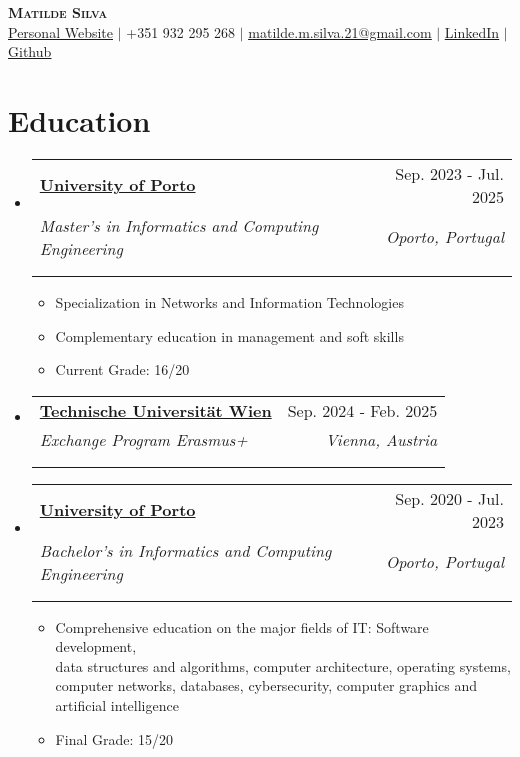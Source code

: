 \documentclass[a4paper,11pt]{article}
\makeatletter
\newcommand{\resumeItem}[1]{
  \item\small{
    {#1 \vspace{-2pt}}
  }
}
\newcommand{\resumeSubheading}[5]{
  \vspace{-2pt}\item
    \begin{tabular*}{0.97\textwidth}[t]{l@{\extracolsep{\fill}}r}
      \textbf{#1} & #2 \\
      \textit{\small#3} & \textit{\small #4} \\
      \if\relax\detokenize{#5}\relax
      \else
        \multicolumn{2}{@{}l}{\textit{\small#5}} \\
      \fi
    \end{tabular*}\vspace{-7pt}
}
\newcommand{\resumeSubHeadingListStart}{\begin{itemize}[leftmargin=0.15in, label={}]}
\newcommand{\resumeSubHeadingListEnd}{\end{itemize}}
\newcommand{\resumeItemListStart}{\begin{itemize}}
\newcommand{\resumeItemListEnd}{\end{itemize}\vspace{-5pt}}
\makeatother
\begin{document}
\begin{center}
    \textbf{\Huge \scshape Matilde Silva} \\ \vspace{10pt}
    \small \href{https://matilde-silva-21.github.io/}{\uline{Personal Website}} $|$
	+351 932 295 268 $|$
	\href{mailto:matilde.m.silva.21@gmail.com}{\uline{matilde.m.silva.21@gmail.com}} $|$
    \href{https://www.linkedin.com/in/matilde-m-silva/}{\uline{LinkedIn}} $|$
    \href{https://github.com/matilde-silva-21}{\uline{Github}}
\end{center}

\section{Education}
  \resumeSubHeadingListStart
      \resumeSubheading
      {\href{https://sigarra.up.pt/feup/en/WEB_PAGE.INICIAL}{University of Porto}}{Sep. 2023 - Jul. 2025}
      {Master's in Informatics and Computing Engineering}{Oporto, Portugal}
      {}
	  	\resumeItemListStart
            \resumeItem{Specialization in Networks and Information Technologies}
			\resumeItem{Complementary education in management and soft skills}
			\resumeItem{Current Grade: 16/20}
		\resumeItemListEnd
    \resumeSubheading
      {\href{https://informatics.tuwien.ac.at/}{Technische Universität Wien}}{Sep. 2024 - Feb. 2025}
      {Exchange Program Erasmus+}{Vienna, Austria}
      {}
    \resumeSubheading
      {\href{https://sigarra.up.pt/feup/en/WEB_PAGE.INICIAL}{University of Porto}}{Sep. 2020 - Jul. 2023}
      {Bachelor's in Informatics and Computing Engineering}{Oporto, Portugal}
      {}
	  	\resumeItemListStart
            \resumeItem{Comprehensive education on the major fields of IT: Software development,\\data structures and algorithms, computer architecture, operating systems,\\computer networks, databases, cybersecurity, computer graphics and artificial intelligence}
			\resumeItem{Final Grade: 15/20}
		\resumeItemListEnd

  \resumeSubHeadingListEnd
\leavevmode


\end{document}
